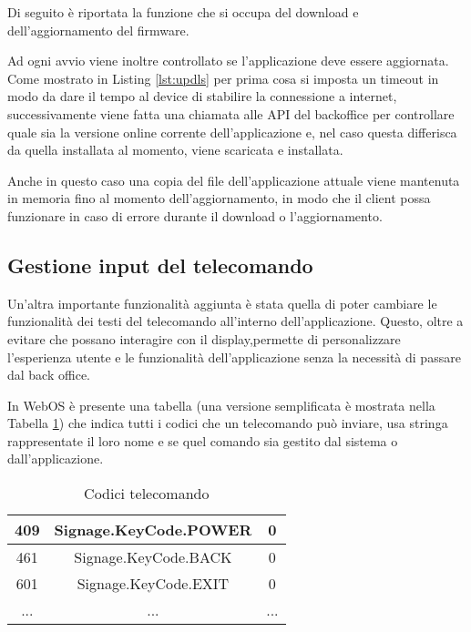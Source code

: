 Di seguito è riportata la funzione che si occupa del download e dell'aggiornamento del firmware.



Ad ogni avvio viene inoltre controllato se l'applicazione deve essere aggiornata.
Come mostrato in Listing \ref*{lst:updls} per prima cosa si imposta un timeout in modo da dare il tempo al device di stabilire la connessione a internet, successivamente viene fatta una chiamata alle API del backoffice per controllare quale sia la versione online corrente dell'applicazione e, nel caso questa differisca da quella installata al momento, viene scaricata e installata.



Anche in questo caso una copia del file dell'applicazione attuale viene mantenuta in memoria fino al momento dell'aggiornamento, in modo che il client possa funzionare in caso di errore durante il download o l'aggiornamento.

\subsection{Gestione input del telecomando}

Un'altra importante funzionalità aggiunta è stata quella di poter cambiare le funzionalità dei testi del telecomando all'interno dell'applicazione.
Questo, oltre a evitare che  possano interagire con il display,permette di personalizzare l'esperienza utente e le funzionalità dell'applicazione senza la necessità di passare dal back office.

In WebOS è presente una tabella (una versione semplificata è mostrata nella Tabella \ref*{tab:keycode}) che indica tutti i codici che un telecomando può inviare, usa stringa rappresentate il loro nome e se quel comando sia gestito dal sistema o dall'applicazione.

\begin{table}
    \centering
    \begin{tabular}{ |c|c|c| } 
         \hline
         409 & Signage.KeyCode.POWER & 0 \\  
         \hline
         461 & Signage.KeyCode.BACK & 0 \\  
         \hline
         601 & Signage.KeyCode.EXIT & 0 \\  
         \hline
         ... & ... & ...\\
         \hline
    \end{tabular}
    \caption{Codici telecomando} \label{tab:keycode}
\end{table}
    
